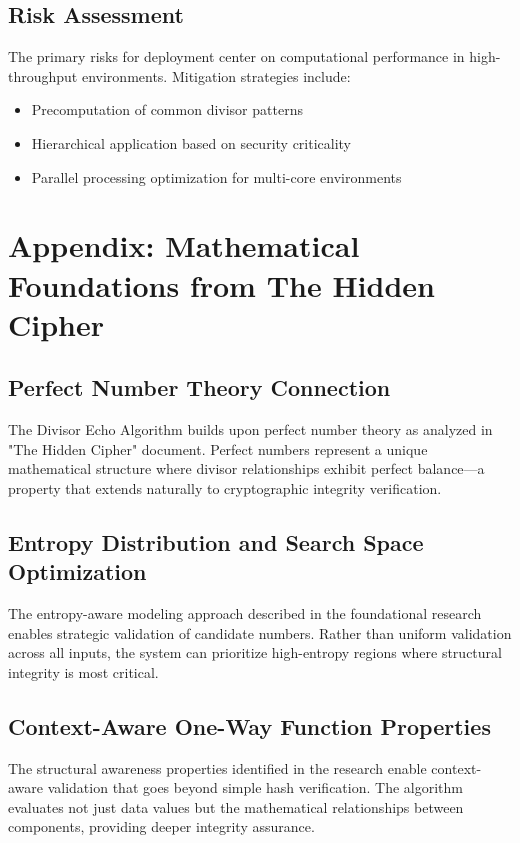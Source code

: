 \documentclass[11pt,letterpaper]{article}
\begin{document}
\subsection{Risk Assessment}

The primary risks for deployment center on computational performance in high-throughput environments. Mitigation strategies include:

\begin{itemize}
\item Precomputation of common divisor patterns
\item Hierarchical application based on security criticality
\item Parallel processing optimization for multi-core environments
\end{itemize}

\section{Appendix: Mathematical Foundations from The Hidden Cipher}

\subsection{Perfect Number Theory Connection}

The Divisor Echo Algorithm builds upon perfect number theory as analyzed in "The Hidden Cipher" document. Perfect numbers represent a unique mathematical structure where divisor relationships exhibit perfect balance---a property that extends naturally to cryptographic integrity verification.

\subsection{Entropy Distribution and Search Space Optimization}

The entropy-aware modeling approach described in the foundational research enables strategic validation of candidate numbers. Rather than uniform validation across all inputs, the system can prioritize high-entropy regions where structural integrity is most critical.

\subsection{Context-Aware One-Way Function Properties}

The structural awareness properties identified in the research enable context-aware validation that goes beyond simple hash verification. The algorithm evaluates not just data values but the mathematical relationships between components, providing deeper integrity assurance.
\end{document}

